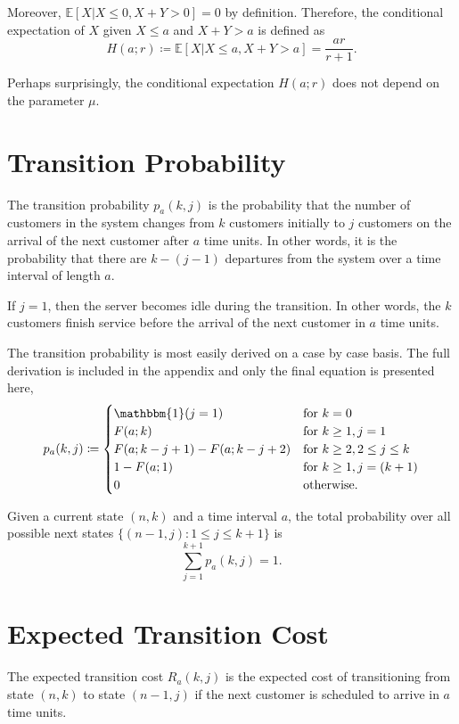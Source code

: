 Moreover, $\mathbb{E} [X | X \leq 0, X + Y > 0] = 0$ by definition. Therefore, the conditional expectation of $X$ given $X \leq a$ and $X + Y > a$ is defined as
\begin{equation}
	H (a; r) \coloneqq \mathbb{E} [X | X \leq a, X + Y > a] = \frac{a r}{r + 1}.
\end{equation}

Perhaps surprisingly, the conditional expectation $H (a; r)$ does not depend on the parameter $\mu$.

\section{Transition Probability}
The transition probability $p_{a} (k, j)$ is the probability that the number of customers in the system changes from $k$ customers initially to $j$ customers on the arrival of the next customer after $a$ time units. In other words, it is the probability that there are $k - (j - 1)$ departures from the system over a time interval of length $a$.

If $j = 1$, then the server becomes idle during the transition. In other words, the $k$ customers finish service before the arrival of the next customer in $a$ time units.

The transition probability is most easily derived on a case by case basis. The full derivation is included in the appendix and only the final equation is presented here,
\begin{equation}
	p_{a} (k, j) \coloneqq \begin{cases}
		\mathbbm{1} (j = 1) & \text{for $k = 0$} \\
		F (a; k) & \text{for $k \geq 1, j = 1$} \\
		F (a; k - j + 1) - F (a; k - j + 2) & \text{for $k \geq 2, 2 \leq j \leq k$} \\
		1 - F (a; 1) & \text{for $k \geq 1, j = (k + 1)$} \\
		0 & \text{otherwise}.
	\end{cases}
\end{equation}

Given a current state $(n, k)$ and a time interval $a$, the total probability over all possible next states $\big\{ (n - 1, j) : 1 \leq j \leq k + 1 \big\}$ is
\begin{equation}
	\sum_{j = 1}^{k + 1} p_{a} (k, j) = 1.
\end{equation}

\section{Expected Transition Cost}
The expected transition cost $R_{a} (k, j)$ is the expected cost of transitioning from state $(n, k)$ to state $(n - 1, j)$ if the next customer is scheduled to arrive in $a$ time units.

